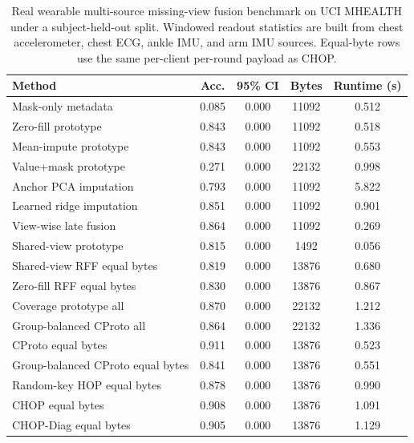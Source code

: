 \begin{table}[t]
\centering
\caption{Real wearable multi-source missing-view fusion benchmark on UCI MHEALTH under a subject-held-out split. Windowed readout statistics are built from chest accelerometer, chest ECG, ankle IMU, and arm IMU sources. Equal-byte rows use the same per-client per-round payload as CHOP.}
\label{tab:if-mhealth-fusion}
\scriptsize
\setlength{\tabcolsep}{3pt}
\renewcommand{\arraystretch}{0.94}
\begin{tabular}{lcccc}
\toprule
Method & Acc. & 95\% CI & Bytes & Runtime (s) \\
\midrule
Mask-only metadata & 0.085 & 0.000 & 11092 & 0.512 \\
Zero-fill prototype & 0.843 & 0.000 & 11092 & 0.518 \\
Mean-impute prototype & 0.843 & 0.000 & 11092 & 0.553 \\
Value+mask prototype & 0.271 & 0.000 & 22132 & 0.998 \\
Anchor PCA imputation & 0.793 & 0.000 & 11092 & 5.822 \\
Learned ridge imputation & 0.851 & 0.000 & 11092 & 0.901 \\
View-wise late fusion & 0.864 & 0.000 & 11092 & 0.269 \\
Shared-view prototype & 0.815 & 0.000 & 1492 & 0.056 \\
Shared-view RFF equal bytes & 0.819 & 0.000 & 13876 & 0.680 \\
Zero-fill RFF equal bytes & 0.830 & 0.000 & 13876 & 0.867 \\
Coverage prototype all & 0.870 & 0.000 & 22132 & 1.212 \\
Group-balanced CProto all & 0.864 & 0.000 & 22132 & 1.336 \\
CProto equal bytes & 0.911 & 0.000 & 13876 & 0.523 \\
Group-balanced CProto equal bytes & 0.841 & 0.000 & 13876 & 0.551 \\
Random-key HOP equal bytes & 0.878 & 0.000 & 13876 & 0.990 \\
CHOP equal bytes & 0.908 & 0.000 & 13876 & 1.091 \\
CHOP-Diag equal bytes & 0.905 & 0.000 & 13876 & 1.129 \\
\bottomrule
\end{tabular}
\end{table}
